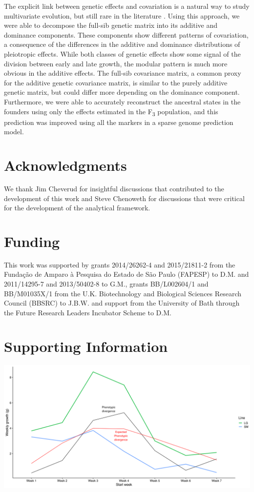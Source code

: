 \begin{refsection}
The explicit link between genetic effects and covariation is a natural
way to study multivariate evolution, but still rare in the literature \parencite{Kelly2009-bj}.
Using this approach, we were able to decompose the full-sib genetic matrix into its
additive and dominance components. These components show different
patterns of covariation, a consequence of the differences in the
additive and dominance distributions of pleiotropic effects. While both
classes of genetic effects show some signal of the division between
early and late growth, the modular pattern is much more obvious in the
additive effects. The full-sib covariance matrix, a common proxy for the
additive genetic covariance matrix, is similar to the purely additive
genetic matrix, but could differ more depending on the dominance
component. Furthermore, we were able to accurately reconstruct the
ancestral states in the founders using only the effects estimated in
the F\textsubscript{3} population, and this prediction was improved using all the
markers in a sparse genome prediction model.


\section{Acknowledgments}
We thank Jim Cheverud for insightful discussions that contributed to the
development of this work and Steve Chenoweth for discussions that were
critical for the development of the analytical framework.


\section{Funding}

This work was supported by grants 2014/26262-4 and 2015/21811-2 from the
Fundação de Amparo à Pesquisa do Estado de São Paulo (FAPESP) to D.M.
and 2011/14295-7 and 2013/50402-8 to G.M., grants BB/L002604/1 and
BB/M01035X/1 from the U.K. Biotechnology and Biological Sciences
Research Council (BBSRC) to J.B.W. and support from the University of
Bath through the Future Research Leaders Incubator Scheme to D.M.

\printbibliography

\newpage

\section*{Supporting Information}

\includegraphics[width=\linewidth]{chapter_JoH-Melo_etal/media/growth_LG_SM_DZ2.png}


\end{refsection}
